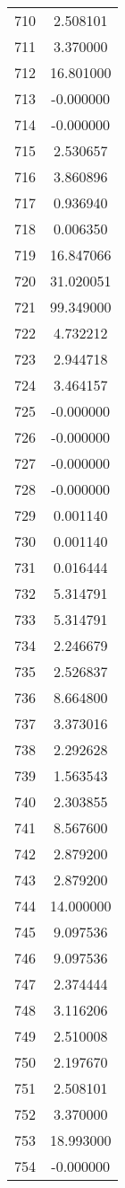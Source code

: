 \documentclass[12pt]{article}
\begin{document}
\begin{longtable}{@{}cc@{}}
710 & 2.508101 \\
711 & 3.370000 \\
712 & 16.801000 \\
713 & -0.000000 \\
714 & -0.000000 \\
715 & 2.530657 \\
716 & 3.860896 \\
717 & 0.936940 \\
718 & 0.006350 \\
719 & 16.847066 \\
720 & 31.020051 \\
721 & 99.349000 \\
722 & 4.732212 \\
723 & 2.944718 \\
724 & 3.464157 \\
725 & -0.000000 \\
726 & -0.000000 \\
727 & -0.000000 \\
728 & -0.000000 \\
729 & 0.001140 \\
730 & 0.001140 \\
731 & 0.016444 \\
732 & 5.314791 \\
733 & 5.314791 \\
734 & 2.246679 \\
735 & 2.526837 \\
736 & 8.664800 \\
737 & 3.373016 \\
738 & 2.292628 \\
739 & 1.563543 \\
740 & 2.303855 \\
741 & 8.567600 \\
742 & 2.879200 \\
743 & 2.879200 \\
744 & 14.000000 \\
745 & 9.097536 \\
746 & 9.097536 \\
747 & 2.374444 \\
748 & 3.116206 \\
749 & 2.510008 \\
750 & 2.197670 \\
751 & 2.508101 \\
752 & 3.370000 \\
753 & 18.993000 \\
754 & -0.000000 \\

\end{longtable}
\end{document}
